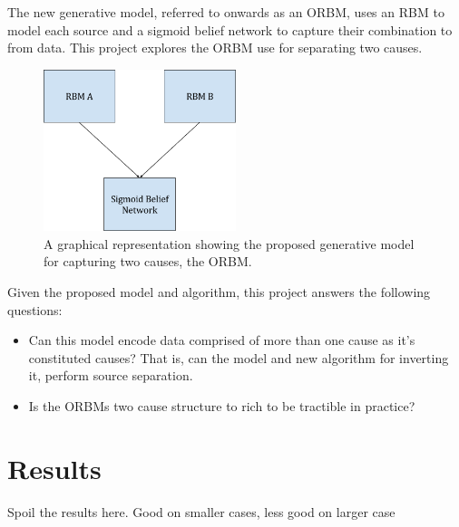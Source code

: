 The new generative model, referred to onwards as an ORBM, uses an RBM to model each source and a sigmoid belief network to capture their combination to from data. This project explores the ORBM use for separating two causes.

\begin{figure}[h]
\begin{center}
  \includegraphics[width = 0.5\textwidth]{Assets/ORBM_fig_1}
\caption{A graphical representation showing the proposed generative model for capturing two causes, the ORBM.}

\label{F:ORBM-fig-1}
\end{center}
\end{figure}

Given the proposed model and algorithm, this project answers the following questions:
\begin{itemize}
  \item Can this model encode data comprised of more than one cause as it's constituted causes? That is, can the model and new algorithm for inverting it, perform source separation.
  \item Is the ORBMs two cause structure to rich to be tractible in practice?
\end{itemize}

\section{Results}
\todo{}
Spoil the results here.
Good on smaller cases, less good on larger case

